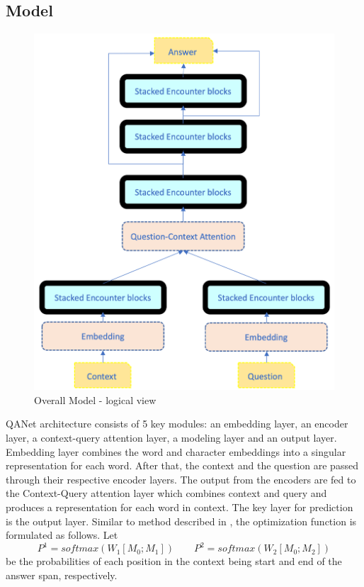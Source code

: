 \documentclass{article}
\begin{document}
\subsection{Model}
\begin{figure}[h!]
\centering
\includegraphics[scale=0.20]{../images/QANet.png}
\caption{\small Overall Model - logical view}
\end{figure}
QANet architecture consists of 5 key modules: an embedding layer, an encoder layer, a context-query attention layer, a modeling layer and an output layer. Embedding layer combines the word and character embeddings into a singular representation for each word. After that, the context and the question are passed through their respective encoder layers. The output from the encoders are fed to the Context-Query attention layer which combines context and query and produces a representation for each word in context. The key layer for prediction is the output layer. Similar to method described in \cite{seo2016bidirectional}, the optimization function is formulated as follows. Let $$P^1 = \textit{softmax}(W_1[M_0 ; M_1]) \qquad P^2 = \textit{softmax}(W_2[M_0 ; M_2])$$ be the probabilities of each position in the context being start and end of the answer span, respectively. 
                                               
\end{document}
